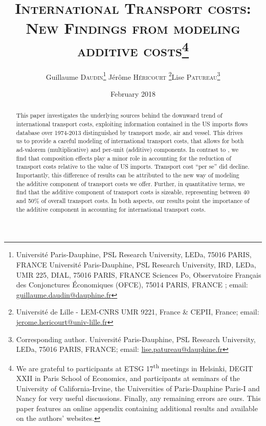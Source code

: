 \documentclass[a4paper,11pt]{article}
\begin{document}
\title{\textsc{International Transport costs:\\New Findings from modeling additive costs}\thanks{We are grateful to participants at ETSG 17\textsuperscript{th} meetings in Helsinki, DEGIT XXII in Paris School of Economics, and participants at seminars of the University of California-Irvine, the Universities of Paris-Dauphine Paris-I and Nancy for very useful discussions. Finally, any remaining errors are ours. This paper features an online appendix containing additional results and available on the authors' websites.}}

\author{Guillaume \textsc{Daudin}\thanks{%
Universit\'{e} Paris-Dauphine, PSL Research University, LEDa, 75016 PARIS, FRANCE \newline
Universit\'{e} Paris-Dauphine, PSL Research University, IRD, LEDa, UMR 225, DIAL, 75016 PARIS, FRANCE \newline
Sciences Po, Observatoire Fran\c{c}ais des Conjonctures \'{E}conomiques (OFCE), 75014 PARIS, FRANCE \newline
; email: \url{guillaume.daudin@dauphine.fr}}  \qquad J\'{e}r\^{o}me \textsc{H\'{e}ricourt} \thanks{Universit\'{e} de Lille - LEM-CNRS UMR 9221, France \& CEPII, France; email: \url{jerome.hericourt@univ-lille.fr}}\qquad Lise \textsc{Patureau}\thanks{Corresponding author. Universit\'{e} Paris-Dauphine, PSL Research University, LEDa, 75016 PARIS, FRANCE;  email: \url{lise.patureau@dauphine.fr} } }





\date{February 2018}
 \maketitle
\bigskip

\begin{abstract}
This paper investigates the underlying sources behind the downward trend of international transport costs, exploiting information contained in the US imports flows database over 1974-2013 distinguished by transport mode, air and vessel. This drives us to provide a careful modeling of international transport costs, that allows for both ad-valorem (multiplicative) and per-unit (additive) components. In contrast to \cite{hummels2007}, we find that composition effects play a minor role in accounting for the reduction of transport costs relative to the value of US imports. Transport cost ``per se'' did decline. Importantly, this difference of results can be attributed to the new way of modeling the additive component of transport costs we offer. Further, in quantitative terms, we find that the additive component of transport costs is sizeable, representing between 40 and 50\% of overall transport costs. In both aspects, our results point the importance of the additive component in accounting for international transport costs.
\end{abstract}
\end{document}
